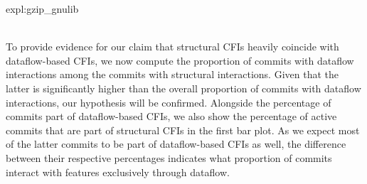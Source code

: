 \caption{expl:gzip_gnulib}\\

To provide evidence for our claim that structural CFIs heavily coincide with dataflow-based CFIs, we now compute the proportion of commits with dataflow interactions among the commits with structural interactions.
Given that the latter is significantly higher than the overall proportion of commits with dataflow interactions, our hypothesis will be confirmed.
Alongside the percentage of commits part of dataflow-based CFIs, we also show the percentage of active commits that are part of structural CFIs in the first bar plot.
As we expect most of the latter commits to be part of dataflow-based CFIs as well, the difference between their respective percentages indicates what proportion of commits interact with features exclusively through dataflow.

